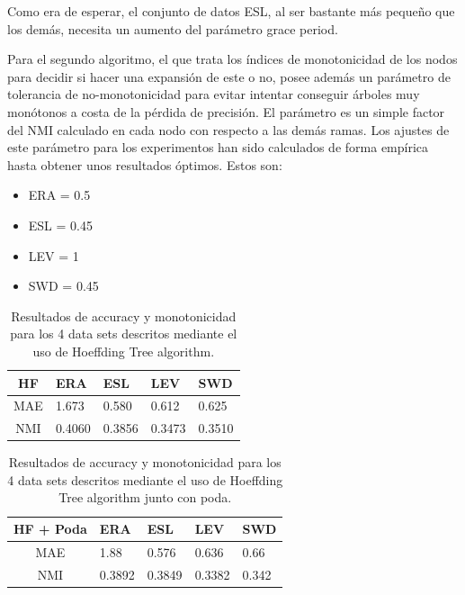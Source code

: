 Como era de esperar, el conjunto de datos ESL, al ser bastante más pequeño que los demás, necesita un aumento del parámetro grace period.

Para el segundo algoritmo, el que trata los índices de monotonicidad de los nodos para decidir si hacer una expansión de este o no, posee además un parámetro de tolerancia de no-monotonicidad para evitar intentar conseguir árboles muy monótonos a costa de la pérdida de precisión. El parámetro es un simple factor del NMI calculado en cada nodo con respecto a las demás ramas. Los ajustes de este parámetro para los experimentos han sido calculados de forma empírica hasta obtener unos resultados óptimos. Estos son:
\begin{itemize}
	\item ERA = 0.5
	\item ESL = 0.45
	\item LEV = 1
	\item SWD = 0.45
\end{itemize}

\begin{table}[H]
	\begin{tabular}{|c|l|l|l|l|}
		\hline
		HF & ERA    & ESL    & LEV &  SWD \\ \hline
		MAE & 1.673 & 0.580 & 0.612                      & 0.625                     \\ \hline
		NMI & 0.4060 & 0.3856 & 0.3473                     & 0.3510                     \\ \hline
	\end{tabular}
\caption{Resultados de accuracy y monotonicidad para los 4 data sets descritos mediante el uso de Hoeffding Tree algorithm.}
\end{table}

\begin{table}[H]
	\begin{tabular}{|c|l|l|l|l|}
		\hline
		HF + Poda & ERA    & ESL    & LEV &  SWD \\ \hline
		MAE & 1.88 & 0.576 & 0.636                      & 0.66                     \\ \hline
		NMI & 0.3892 & 0.3849 & 0.3382                     & 0.342                     \\ \hline
	\end{tabular}
	\caption{Resultados de accuracy y monotonicidad para los 4 data sets descritos mediante el uso de Hoeffding Tree algorithm junto con poda.}
\end{table}

